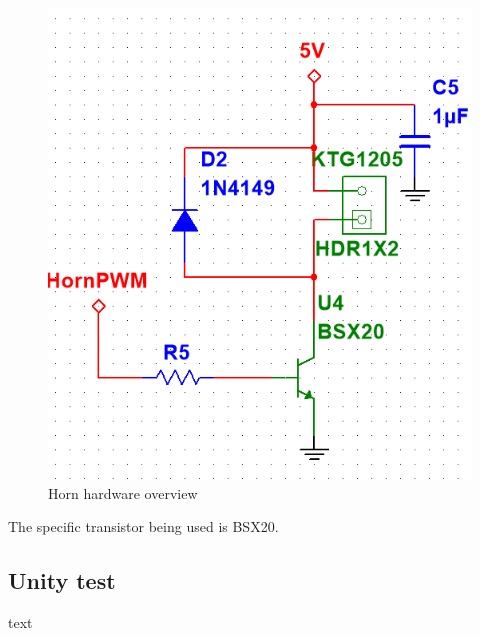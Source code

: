 \begin{figure}[H]
	\centering
	\includegraphics[width=0.7\linewidth]{Hardware/Pictures/Horn_hw}
	\caption{Horn hardware overview}
	\label{fig:Horn control}
\end{figure}

The specific transistor being used is BSX20.

\subsection{Unity test}
text